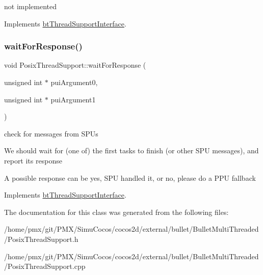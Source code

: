 not implemented 

Implements \hyperlink{classbtThreadSupportInterface_a2c20a0b41be978c429e0b1a2b2f03152}{bt\+Thread\+Support\+Interface}.

\mbox{\label{classPosixThreadSupport_a65bf7f0f96518d97f781b0559495f91d}} 
\subsubsection{\texorpdfstring{wait\+For\+Response()}{waitForResponse()}}
{\footnotesize\ttfamily void Posix\+Thread\+Support\+::wait\+For\+Response (\begin{DoxyParamCaption}\item[{unsigned int $\ast$}]{pui\+Argument0,  }\item[{unsigned int $\ast$}]{pui\+Argument1 }\end{DoxyParamCaption})\hspace{0.3cm}{\ttfamily [virtual]}}



check for messages from S\+P\+Us 

We should wait for (one of) the first tasks to finish (or other S\+PU messages), and report its response

A possible response can be \textquotesingle{}yes, S\+PU handled it\textquotesingle{}, or \textquotesingle{}no, please do a P\+PU fallback\textquotesingle{} 

Implements \hyperlink{classbtThreadSupportInterface_abe3c8fa6998096a4804dbfd28882cfd9}{bt\+Thread\+Support\+Interface}.



The documentation for this class was generated from the following files\+:\begin{DoxyCompactItemize}
\item 
/home/pmx/git/\+P\+M\+X/\+Simu\+Cocos/cocos2d/external/bullet/\+Bullet\+Multi\+Threaded/Posix\+Thread\+Support.\+h\item 
/home/pmx/git/\+P\+M\+X/\+Simu\+Cocos/cocos2d/external/bullet/\+Bullet\+Multi\+Threaded/Posix\+Thread\+Support.\+cpp\end{DoxyCompactItemize}
